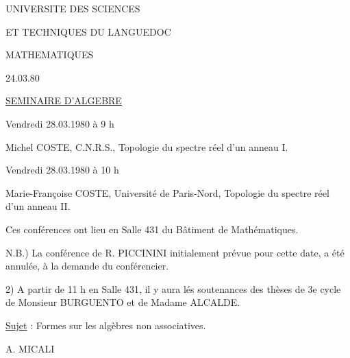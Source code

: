 UNIVERSITE DES SCIENCES

ET TECHNIQUES DU LANGUEDOC

MATHEMATIQUES

24.03.80

\uline{SEMINAIRE D'ALGEBRE}

Vendredi 28.03.1980 à 9 h

Michel COSTE, C.N.R.S., Topologie du spectre réel d'un anneau I.

Vendredi 28.03.1980 à 10 h

Marie-Françoise COSTE, Université de Paris-Nord, Topologie du spectre réel d'un anneau II.

Ces conférences ont lieu en Salle 431 du Bâtiment de Mathématiques.

N.B.) La conférence de R. PICCININI initialement prévue pour cette date, a été annulée, à la demande du conférencier.

2) A partir de 11 h en Salle 431, il y aura lés soutenances des thèses de 3e cycle de Monsieur BURGUENTO et de Madame ALCALDE.

\uline{Sujet} : Formes sur les algèbres non associatives.

A. MICALI

